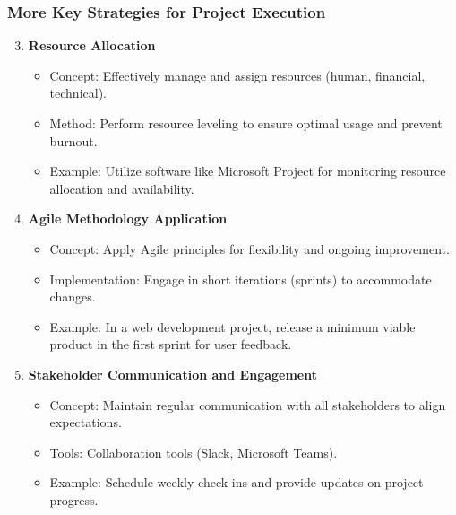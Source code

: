 \documentclass[aspectratio=169]{beamer}
\begin{document}
\begin{frame}[fragile]
  \frametitle{More Key Strategies for Project Execution}
  \begin{enumerate}
    \setcounter{enumi}{2}
    \item \textbf{Resource Allocation}
      \begin{itemize}
        \item Concept: Effectively manage and assign resources (human, financial, technical).
        \item Method: Perform resource leveling to ensure optimal usage and prevent burnout.
        \item Example: Utilize software like Microsoft Project for monitoring resource allocation and availability.
      \end{itemize}

    \item \textbf{Agile Methodology Application}
      \begin{itemize}
        \item Concept: Apply Agile principles for flexibility and ongoing improvement.
        \item Implementation: Engage in short iterations (sprints) to accommodate changes.
        \item Example: In a web development project, release a minimum viable product in the first sprint for user feedback.
      \end{itemize}

    \item \textbf{Stakeholder Communication and Engagement}
      \begin{itemize}
        \item Concept: Maintain regular communication with all stakeholders to align expectations.
        \item Tools: Collaboration tools (Slack, Microsoft Teams).
        \item Example: Schedule weekly check-ins and provide updates on project progress.
      \end{itemize}
  \end{enumerate}
\end{frame}
\end{document}

